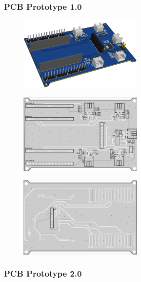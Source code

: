 \subsubsection{PCB Prototype 1.0}

\begin{figure}[H]
    \centering
    \captionsetup{justification=centering, margin=1cm}
    \includegraphics[width=0.55\textwidth]{img/proto-pcb1.png}
\end{figure}

\begin{figure}[H]
    \centering
    \captionsetup{justification=centering, margin=1cm}
    \includegraphics[width=0.55\textwidth]{img/PCBit1_front.png}
\end{figure}

\begin{figure}[H]
    \centering
    \captionsetup{justification=centering, margin=1cm}
    \includegraphics[width=0.55\textwidth]{img/PCBit1_back.png}
\end{figure}

\pagebreak
\subsubsection{PCB Prototype 2.0}

